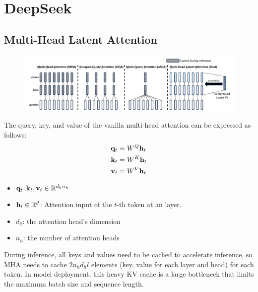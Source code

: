 \chapter{DeepSeek}

\section{Multi-Head Latent Attention}

\begin{figure}[h]
	\centering
	\includegraphics[scale=0.32]{./images/DeepSeek/mla.png}
\end{figure}

The query, key, and value of the vanilla multi-head attention can be expressed as follows:
\begin{align*}
	{\mathbf{q}}_t &= W^{Q}{\mathbf{h}}_t\\
	{\mathbf{k}}_t &= W^{K}{\mathbf{h}}_t\\
	{\mathbf{v}}_t &= W^{V}{\mathbf{h}}_t
\end{align*}
\begin{itemize}
	\item ${\mathbf{q}}_t,{\mathbf{k}}_t,{\mathbf{v}}_t\in \mathbb{R}^{d_hn_h}$
	\item ${\mathbf{h}}_t\in \mathbb{R}^{d}$: Attention input of the $t$-th token at an layer.
	\item $d_h$: the attention head's dimension
	\item $n_h$: the number of attention heads
\end{itemize}
During inference, all keys and values need to be cached to accelerate inference, so MHA needs to cache $2n_hd_hl$ elements (\ie key, value for each layer and head) for each token. In model deployment, this heavy KV cache is a large bottleneck that limits the maximum batch size and sequence length.

